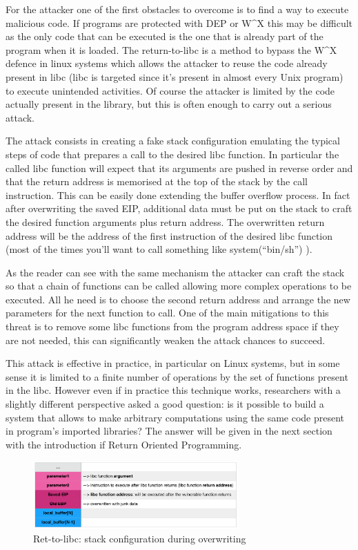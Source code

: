 \documentclass[Lau,binding=0.6cm]{sapthesis}
\begin{document}
For the attacker one of the first obstacles to overcome is to find a way to execute malicious code. If programs are protected with DEP or W\textasciicircum X this may be difficult as the only code that can be executed is the one that is already part of the program when it is loaded.
The return-to-libc is a method to bypass the W\textasciicircum X defence in linux systems which allows the attacker to reuse the code already present in libc (libc is targeted since it’s present in almost every Unix program) to execute unintended activities. Of course the attacker is limited by the code actually present in the library, but this is often enough to carry out a serious attack.

The attack consists in creating a fake stack configuration emulating the typical steps of code that prepares a call to the desired libc function. In particular the called libc function will expect that its arguments are pushed in reverse order and that the return address is memorised at the top of the stack by the call instruction.   
This can be easily done extending the buffer overflow process. In fact after overwriting the saved EIP, additional data must be put on the stack to craft the desired function arguments plus return address. The overwritten return address will be the address of the first instruction of the desired libc function (most of the times you’ll want to call something like system(“bin/sh”) ).  

As the reader can see with the same mechanism the attacker can craft the stack so that a chain of  functions can be called allowing more complex operations to be executed. All he need is to choose the second return address and arrange the new parameters for the next function to call.
One of the main mitigations to this threat is to remove some libc functions from the program address space if they are not needed, this can significantly weaken the attack chances to succeed.

This attack is effective in practice, in particular on Linux systems, but in some sense it is limited to a finite number of operations by the set of functions present in the libc. However even if in practice this technique works, researchers with a slightly different perspective asked a good question: is it possible to build a system that allows to make arbitrary computations using the same code present in program's imported libraries? The answer will be given in the next section with the introduction if Return Oriented Programming.

\begin{figure}
\centering
\includegraphics[width=0.7\textwidth]{ret-to-libc1}
\caption{Ret-to-libc: stack configuration during overwriting}
\label{fig:largenenough}
\end{figure}
\end{document}
